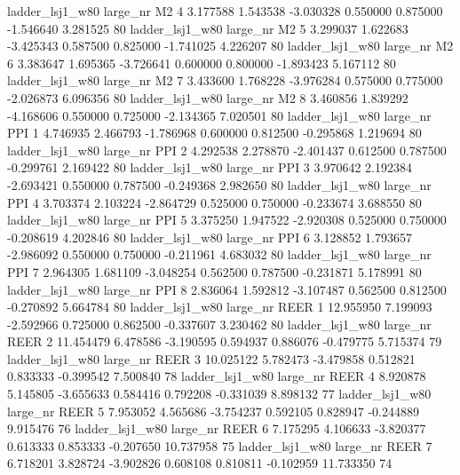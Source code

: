     ladder_lsj1_w80   large_nr       M2                 4  3.177588  1.543538  -3.030328 0.550000 0.875000 -1.546640    3.281525 80
    ladder_lsj1_w80   large_nr       M2                 5  3.299037  1.622683  -3.425343 0.587500 0.825000 -1.741025    4.226207 80
    ladder_lsj1_w80   large_nr       M2                 6  3.383647  1.695365  -3.726641 0.600000 0.800000 -1.893423    5.167112 80
    ladder_lsj1_w80   large_nr       M2                 7  3.433600  1.768228  -3.976284 0.575000 0.775000 -2.026873    6.096356 80
    ladder_lsj1_w80   large_nr       M2                 8  3.460856  1.839292  -4.168606 0.550000 0.725000 -2.134365    7.020501 80
    ladder_lsj1_w80   large_nr      PPI                 1  4.746935  2.466793  -1.786968 0.600000 0.812500 -0.295868    1.219694 80
    ladder_lsj1_w80   large_nr      PPI                 2  4.292538  2.278870  -2.401437 0.612500 0.787500 -0.299761    2.169422 80
    ladder_lsj1_w80   large_nr      PPI                 3  3.970642  2.192384  -2.693421 0.550000 0.787500 -0.249368    2.982650 80
    ladder_lsj1_w80   large_nr      PPI                 4  3.703374  2.103224  -2.864729 0.525000 0.750000 -0.233674    3.688550 80
    ladder_lsj1_w80   large_nr      PPI                 5  3.375250  1.947522  -2.920308 0.525000 0.750000 -0.208619    4.202846 80
    ladder_lsj1_w80   large_nr      PPI                 6  3.128852  1.793657  -2.986092 0.550000 0.750000 -0.211961    4.683032 80
    ladder_lsj1_w80   large_nr      PPI                 7  2.964305  1.681109  -3.048254 0.562500 0.787500 -0.231871    5.178991 80
    ladder_lsj1_w80   large_nr      PPI                 8  2.836064  1.592812  -3.107487 0.562500 0.812500 -0.270892    5.664784 80
    ladder_lsj1_w80   large_nr     REER                 1 12.955950  7.199093  -2.592966 0.725000 0.862500 -0.337607    3.230462 80
    ladder_lsj1_w80   large_nr     REER                 2 11.454479  6.478586  -3.190595 0.594937 0.886076 -0.479775    5.715374 79
    ladder_lsj1_w80   large_nr     REER                 3 10.025122  5.782473  -3.479858 0.512821 0.833333 -0.399542    7.500840 78
    ladder_lsj1_w80   large_nr     REER                 4  8.920878  5.145805  -3.655633 0.584416 0.792208 -0.331039    8.898132 77
    ladder_lsj1_w80   large_nr     REER                 5  7.953052  4.565686  -3.754237 0.592105 0.828947 -0.244889    9.915476 76
    ladder_lsj1_w80   large_nr     REER                 6  7.175295  4.106633  -3.820377 0.613333 0.853333 -0.207650   10.737958 75
    ladder_lsj1_w80   large_nr     REER                 7  6.718201  3.828724  -3.902826 0.608108 0.810811 -0.102959   11.733350 74
